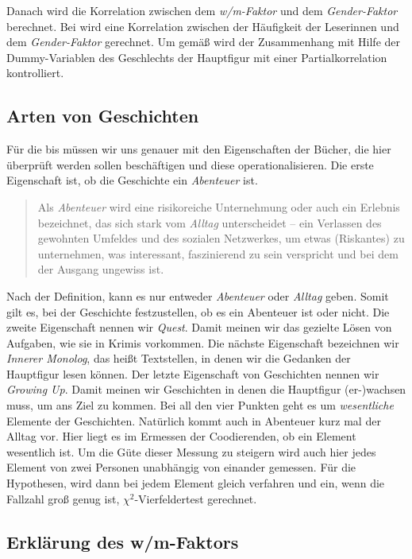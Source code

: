 Danach wird die Korrelation zwischen dem \emph{w/m-Faktor} und dem
\emph{Gender-Faktor} berechnet. Bei  wird eine Korrelation
zwischen der Häufigkeit der Leserinnen und dem \emph{Gender-Faktor}
gerechnet. Um gemäß  wird der Zusammenhang mit Hilfe der
Dummy-Variablen des Geschlechts der Hauptfigur mit einer
Partialkorrelation kontrolliert.

\subsection{Arten von Geschichten}

Für die  bis  müssen wir uns genauer mit den
Eigenschaften der Bücher, die hier überprüft werden sollen beschäftigen
und diese operationalisieren. Die erste Eigenschaft ist, ob die
Geschichte ein \emph{Abenteuer} ist.
\blockcquote[Hervorhebung P.\,F.][\texttt{\href{http://de.wikipedia.org/wiki/abenteuer}{/wiki/abenteuer}}]{de.wiki}{Als \emph{Abenteuer} \textelp{} wird eine risikoreiche Unternehmung oder auch ein Erlebnis bezeichnet, das sich stark vom \emph{Alltag} unterscheidet -- ein Verlassen des gewohnten Umfeldes und des sozialen Netzwerkes, um etwas (Riskantes) zu unternehmen, was interessant, faszinierend zu sein verspricht und bei dem der Ausgang ungewiss ist.}
Nach der Definition, kann es nur entweder \emph{Abenteuer} oder
\emph{Alltag} geben. Somit gilt es, bei der Geschichte festzustellen, ob
es ein Abenteuer ist oder nicht. Die zweite Eigenschaft nennen wir
\emph{Quest}. Damit meinen wir das gezielte Lösen von Aufgaben, wie sie
\zB in Krimis vorkommen. Die nächste Eigenschaft bezeichnen wir
\emph{Innerer Monolog}, das heißt Textstellen, in denen wir die Gedanken
der Hauptfigur lesen können. Der letzte Eigenschaft von Geschichten
nennen wir \emph{Growing Up}. Damit meinen wir Geschichten in denen die
Hauptfigur (er-)wachsen muss, um ans Ziel zu kommen. Bei all den vier
Punkten geht es um \emph{wesentliche} Elemente der Geschichten.
Natürlich kommt auch in Abenteuer kurz mal der Alltag vor. Hier liegt es
im Ermessen der Coodierenden, ob ein Element wesentlich ist. Um die Güte
dieser Messung zu steigern wird auch hier jedes Element von zwei
Personen unabhängig von einander gemessen. Für die Hypothesen, wird dann
bei jedem Element gleich verfahren und ein, wenn die Fallzahl groß genug
ist, $\chi^2$-Vierfeldertest gerechnet.

\subsection{Erklärung des w/m-Faktors}

